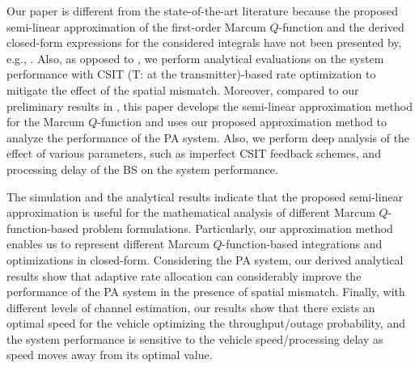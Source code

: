 Our paper is different from the state-of-the-art literature because the proposed semi-linear approximation of the first-order Marcum $Q$-function and the derived closed-form expressions for the considered integrals have not been presented by, e.g., \cite{Bocus2013CLapproximation,helstrom1994elements,Makki2013TCfeedback,Makki2011Eurasipcapacity,Makki2018WCLwireless,Makki2016TVTperformance,Simon2003TWCsome,Suraweera2010TVTcapacity,Kang2003JSAClargest,Chen2004TCdistribution,Ma2000JSACunified,Zhang2002TCgeneral,Ghasemi2008ICMspectrum,Digham2007TCenergy, simon2002bookdigital,Fu2011GLOBECOMexponential,zhao2008ELtight,Simon2000TCexponential,Cao2016CLsolutions,sofotasios2015solutions,Cui2012ELtwo,Azari2018TCultra,Alam2014INFOCOMWrobust,Gao2018IAadmm,Shen2018TVToutage,Song2017JLTimpact,Tang2019IAan,annamalai2001WCMCcauchy,Sofotasios2010ISWCSnovel,Li2010TCnew,andras2011Mathematicageneralized,Gaur2003TVTsome,Kam2008TCcomputing,Corazza2002TITnew,Baricz2009TITnew,chiani1999ELintegral,Sternad2012WCNCWusing,DT2015ITSMmaking,BJ2017PIMRCpredictor,phan2018WSAadaptive,Jamaly2014EuCAPanalysis, BJ2017ICCWusing,Apelfrojd2018PIMRCkalman,Jamaly2019IETeffects,Guo2019WCLrate}. Also, as opposed to \cite{Sternad2012WCNCWusing,DT2015ITSMmaking,BJ2017PIMRCpredictor,phan2018WSAadaptive,Jamaly2014EuCAPanalysis, BJ2017ICCWusing,Apelfrojd2018PIMRCkalman,Jamaly2019IETeffects}, we perform analytical evaluations on the system performance with CSIT (T: at the transmitter)-based rate optimization to mitigate the effect of the spatial mismatch. Moreover, compared to our preliminary results in \cite{Guo2019WCLrate}, this paper develops the semi-linear approximation method for the Marcum $Q$-function and uses our proposed approximation method to analyze the performance of the PA system. Also, we perform deep analysis of the effect of various parameters, such as imperfect CSIT feedback schemes, and processing delay of the BS on the system performance. 



The simulation and the analytical results indicate that the proposed semi-linear approximation is useful for the mathematical analysis of different Marcum $Q$-function-based problem formulations. Particularly, our approximation method enables us to represent different Marcum $Q$-function-based integrations and optimizations in closed-form. Considering the PA system, our derived analytical results show that adaptive rate allocation can considerably improve the performance of the PA system in the presence of spatial mismatch. Finally, with different levels of channel estimation, our results show that there exists an optimal speed for the vehicle optimizing the throughput/outage probability, and the system performance is sensitive to the vehicle speed/processing delay as speed moves away from its optimal value. 


